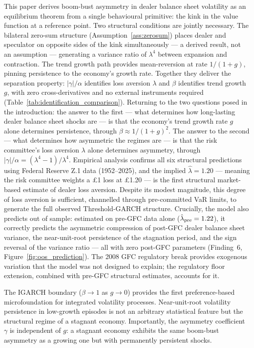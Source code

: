 \documentclass[12pt,a4paper]{article}
\theoremstyle{definition}
\begin{document}
This paper derives boom-bust asymmetry in dealer balance sheet volatility
as an equilibrium theorem from a single behavioural primitive: the kink
in the value function at a reference point. Two structural conditions
are jointly necessary. The bilateral zero-sum structure
(Assumption~\ref{ass:zerosum}) places dealer and speculator on opposite
sides of the kink simultaneously --- a derived result, not an assumption
--- generating a variance ratio of $\lambda^4$ between expansion and
contraction. The trend growth path provides mean-reversion at rate
$1/(1+g)$, pinning persistence to the economy's growth rate. Together
they deliver the separation property: $|\gamma|/\alpha$ identifies loss
aversion $\lambda$ and $\beta$ identifies trend growth $g$, with zero
cross-derivatives and no external instruments required
(Table~\ref{tab:identification_comparison}). Returning to the two
questions posed in the introduction: the answer to the first --- what
determines how long-lasting dealer balance sheet shocks are --- is that
the economy's trend growth rate $g$ alone determines persistence,
through $\beta \approx 1/(1+g)^2$. The answer to the second --- what
determines how asymmetric the regimes are --- is that the risk
committee's loss aversion $\lambda$ alone determines asymmetry, through
$|\gamma|/\alpha = (\lambda^4 - 1)/\lambda^4$. Empirical analysis
confirms all six structural predictions using Federal Reserve Z.1 data
(1952--2025), and the implied $\hat{\lambda} = 1.20$ --- meaning the
risk committee weights a \pounds 1 loss at \pounds 1.20 --- is the
first structural market-based estimate of dealer loss aversion. Despite
its modest magnitude, this degree of loss aversion is sufficient,
channelled through pre-committed VaR limits, to generate the full
observed Threshold-GARCH structure. Crucially,
the model also predicts out of sample: estimated on pre-GFC data alone
($\hat{\lambda}_{\rm pre} = 1.22$), it correctly predicts the
asymmetric compression of post-GFC dealer balance sheet variance, the
near-unit-root persistence of the stagnation period, and the sign
reversal of the variance ratio --- all with zero post-GFC parameters
(Finding~6, Figure~\ref{fig:oos_prediction}). The 2008 GFC regulatory
break provides exogenous variation that the model was not designed to
explain; the regulatory floor extension, combined with pre-GFC
structural estimates, accounts for it.

The IGARCH boundary ($\beta \to 1$ as $g \to 0$) provides the first
preference-based microfoundation for integrated volatility processes.
Near-unit-root volatility persistence in low-growth episodes is not an
arbitrary statistical feature but the structural regime of a stagnant
economy. Importantly, the asymmetry coefficient $\gamma$ is independent
of $g$: a stagnant economy exhibits the same boom-bust asymmetry as a
growing one but with permanently persistent shocks.
\end{document}
